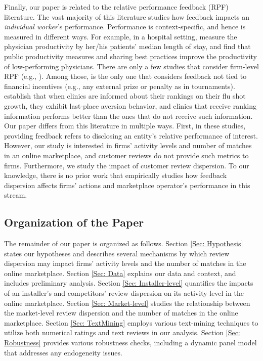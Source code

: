 \documentclass[msom,blindrev]{informs3}
\begin{document}
	
	Finally, our paper is related to the relative performance feedback (RPF) literature. The vast majority of this literature studies how feedback impacts an \emph{individual worker}'s performance. Performance is context-specific, and hence is measured in different ways. For example, in a hospital setting, \cite{song2017closing} measure the physician productivity by her/his patients' median length of stay, and find that public productivity measures and sharing best practices improve the productivity of low-performing physicians. There are only a few studies that consider firm-level RPF (e.g., \cite{josse2013}). Among those, \cite{staats} is the only one that considers feedback not tied to financial incentives (e.g., any external prize or penalty as in tournaments). \cite{staats} establish that when clinics are informed about their rankings on their flu shot growth, they exhibit last-place aversion behavior, and clinics that receive ranking information performs better than the ones that do not receive such information. Our paper differs from this literature in multiple ways. First, in these studies, providing feedback refers to disclosing an entity's relative performance of interest. However, our study is interested in firms' activity levels and number of matches in an online marketplace, and customer reviews do not provide such metrics to firms. Furthermore, we study the impact of customer review dispersion. To our knowledge, there is no prior work that empirically studies how feedback dispersion affects firms' actions and marketplace operator's performance in this stream.
	
	\subsection{Organization of the Paper}
	
	The remainder of our paper is organized as follows. Section \ref{Sec: Hypothesis} states our hypotheses and describes several mechanisms by which review dispersion may impact firms' activity levels and the number of matches in the online marketplace. Section \ref{Sec: Data} explains our data and context, and includes preliminary analysis. Section \ref{Sec: Installer-level} quantifies the impacts of an installer's and competitors' review dispersion on its activity level in the online marketplace. Section \ref{Sec: Market-level} studies the relationship between the market-level review dispersion and the number of matches in the online marketplace. Section \ref{Sec: TextMining} employs various text-mining techniques to utilize both numerical ratings and text reviews in our analysis. Section \ref{Sec: Robustness}  provides various robustness checks, including a dynamic panel model that addresses any endogeneity issues.
	
\end{document}
